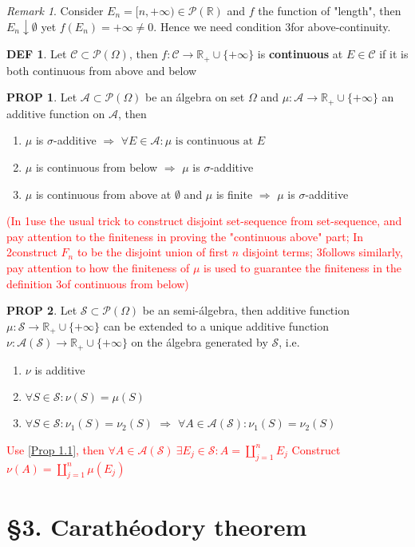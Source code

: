 \documentclass[hidelinks]{article}
\theoremstyle{definition}
\newtheorem*{defin}{DEF}
\theoremstyle{dotless}
\newtheorem{proposition}{PROP}[section]
\theoremstyle{remark}
\newtheorem*{remark}{Remark}
\begin{document}
\begin{remark}
Consider $E_n=[n,+\infty)\in\mathscr{P}(\mathbb{R})$ and $f$ the function of "length", then $E_n\downarrow\emptyset$ yet $f(E_n)=+\infty\neq0$. Hence we need condition 3\degree for above-continuity.
\end{remark}

\begin{defin}
Let $\mathscr{C}\subset\mathscr{P}(\Omega)$, then $f:\mathscr{C}\to\mathbb{R}_+\cup\{+\infty\}$ is \textbf{continuous} at $E\in\mathscr{C}$ if it is both continuous from above and below
\end{defin}

\begin{proposition}
Let $\mathscr{A}\subset\mathscr{P}(\Omega)$ be an álgebra on set $\Omega$ and $\mu:\mathscr{A}\to\mathbb{R}_+\cup\{+\infty\}$ an additive function on $\mathscr{A}$, then \begin{enumerate}[label=\arabic*\degree]
    \item $\mu$ is $\sigma$-additive $\Rightarrow$ $\forall E\in\mathscr{A}:\mu\textrm{ is continuous at }E$
    \item $\mu$ is continuous from below $\Rightarrow$ $\mu$ is $\sigma$-additive
    \item $\mu$ is continuous from above at $\emptyset$ and $\mu$ is finite $\Rightarrow$ $\mu$ is $\sigma$-additive
\end{enumerate}
\end{proposition}
\textcolor{red}{(In 1\degree  use the usual trick to construct disjoint set-sequence from set-sequence, and pay attention to the finiteness in proving the "continuous above" part; In 2\degree construct $F_n$ to be the disjoint union of first $n$ disjoint terms; 3\degree follows similarly, pay attention to how the finiteness of $\mu$ is used to guarantee the finiteness in the definition 3\degree of continuous from below)}

\begin{proposition}
Let $\mathscr{S}\subset\mathscr{P}(\Omega)$ be an semi-álgebra, then additive function $\mu: \mathscr{S}\to \mathbb{R}_+\cup\{+\infty\}$ can be extended to a unique additive function $\nu: \mathscr{A}(\mathscr{S})\to \mathbb{R}_+\cup\{+\infty\}$ on the álgebra generated by $\mathscr{S}$, i.e.
\begin{enumerate}[label=\arabic*\degree]
    \item $\nu$ is additive
    \item $\forall S\in\mathscr{S}:\nu(S)=\mu(S)$
    \item $\forall S\in\mathscr{S}:\nu_1(S)=\nu_2(S)$ $\Rightarrow$ $\forall A\in\mathscr{A}(\mathscr{S}):\nu_1(S)=\nu_2(S)$
\end{enumerate}
\end{proposition}
\textcolor{red}{Use \autoref{Prop 1.1}, then $\forall A\in\mathscr{A}(\mathscr{S})\ \exists E_j\in\mathscr{S}:A=\coprod_{j=1}^nE_j$ Construct $\nu(A)=\coprod_{j=1}^n\mu(E_j)$}

\section*{\S3. Carathéodory theorem}
\setcounter{section}{3}
\end{document}
